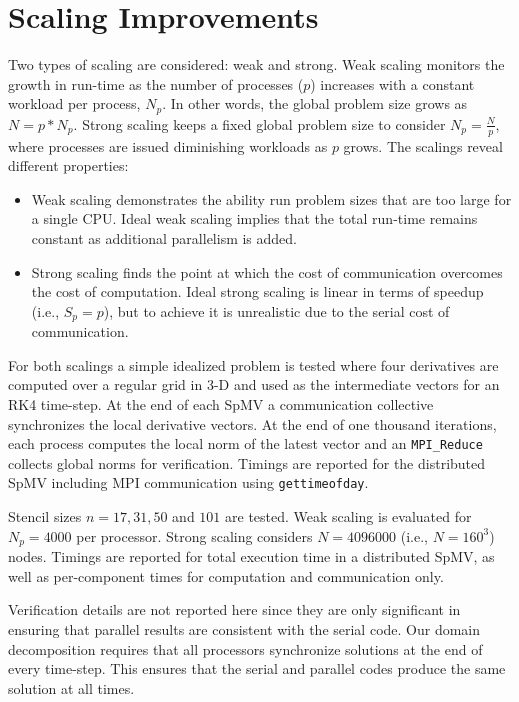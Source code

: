 \documentclass{report}
\begin{document}
\section{Scaling Improvements} 
\label{sec:cpu_scaling}


Two types of scaling are considered: weak and strong. Weak scaling monitors the growth in run-time as the number of processes ($p$) increases with a constant workload per process, $N_p$. In other words, the global problem size grows as $N = p*N_p$. Strong scaling keeps a fixed global problem size to consider $N_p = \frac{N}{p}$, where processes are issued diminishing workloads as $p$ grows. 
The scalings reveal different properties:
\begin{itemize} 
\item Weak scaling demonstrates the ability run problem sizes that are too large for a single CPU. Ideal weak scaling implies that the total run-time remains constant as additional parallelism is added. %
\item Strong scaling finds the point at which the cost of communication overcomes the cost of computation. Ideal strong scaling is linear in terms of speedup (i.e., $S_p = p$), but to achieve it is unrealistic due to the serial cost of communication. 
\end{itemize}
 

For both scalings a simple idealized problem is tested where four derivatives are computed over a regular grid in 3-D and used as the intermediate vectors for an RK4 time-step. At the end of each SpMV a communication collective synchronizes the local derivative vectors. At the end of one thousand iterations, each process computes the local norm of the latest vector and an \texttt{MPI\_Reduce} collects global norms for verification. Timings are reported for the distributed SpMV including MPI communication using \texttt{gettimeofday}.

Stencil sizes $n=17, 31, 50$ and $101$ are tested. Weak scaling is evaluated for $N_p=4000$ per processor. Strong scaling considers $N=4096000$ (i.e., $N=160^3$) nodes. Timings are reported for total execution time in a distributed SpMV, as well as per-component times for computation and communication only.


Verification details are not reported here since they are only significant in ensuring that parallel results are consistent with the serial code. Our domain decomposition requires that all processors synchronize solutions at the end of every time-step. This ensures that the serial and parallel codes produce the same solution at all times. 
\end{document}
